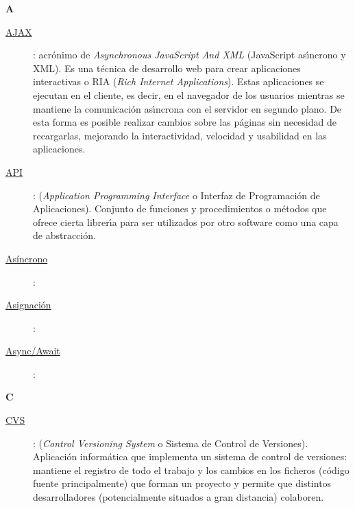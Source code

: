 {\bfseries {\Huge A}}\label{Apendice1:A}
\bigskip
\bigskip

\begin{description}
  \item[\underline{AJAX}\label{apend1:ajax}]: acr\'onimo de \textit{Asynchronous JavaScript And XML} (JavaScript as\'{\i}ncrono y XML). Es una t\'ecnica de desarrollo web para crear aplicaciones 
  interactivas o RIA (\textit{Rich Internet Applications}). Estas aplicaciones se ejecutan en el cliente, es decir, en el navegador de los usuarios mientras se 
  mantiene la comunicaci\'on as\'{\i}ncrona con el servidor en segundo plano. De esta forma es posible realizar cambios sobre las p\'aginas sin necesidad de 
  recargarlas, mejorando la interactividad, velocidad y usabilidad en las aplicaciones.
  \bigskip
\end{description}

\begin{description}
  \item[\underline{API}\label{apend1:api}]: (\textit{Application Programming Interface} o Interfaz de Programaci\'on de Aplicaciones). Conjunto de funciones y procedimientos o m\'etodos que 
  ofrece cierta librer\'{\i}a para ser utilizados por otro software como una capa de abstracci\'on. 
  \bigskip
\end{description}

\begin{description}
  \item[\underline{Asíncrono}\label{apend1:asincrono}]: 
  \bigskip
\end{description}

\begin{description}
  \item[\underline{Asignación}\label{apend1:asignacion}]: 
  \bigskip
\end{description}

\begin{description}
  \item[\underline{Async/Await}\label{apend1:async-await}]: 
  \bigskip
\end{description}


\bigskip
{\bfseries {\Huge C}}\label{Apendice1:C}
\bigskip
\bigskip

\begin{description}
   \item[\underline{CVS}\label{apend1:cvs}]: (\textit{Control Versioning System} o Sistema de Control de Versiones). Aplicaci\'on inform\'atica que implementa un sistema de control de 
  versiones: mantiene el registro de todo el trabajo y los cambios en los ficheros (c\'odigo fuente principalmente) que forman un proyecto y permite que distintos desarrolladores 
  (potencialmente situados a gran distancia) colaboren.
  \bigskip
\end{description}


